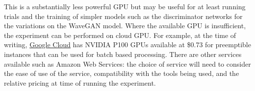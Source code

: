 \documentclass[a4paper, titlepage]{article}
\begin{document}
This is a substantially less powerful GPU but may be useful for at least running trials and the training of simpler models such as the discriminator networks for the variations on the WaveGAN model.
\newline
\newline
Where the available GPU is insufficient, the experiment can be performed on cloud GPU.
For example, at the time of writing, \href{https://cloud.google.com/gpu/}{Google Cloud} has NVIDIA P100 GPUs available at \$0.73 for preemptible instances that can be used for batch based processing.
There are other services available such as Amazon Web Services: the choice of service will need to consider the ease of use of the service, compatibility with the tools being used, and the relative pricing at time of running the experiment.

\newpage



\end{document}
